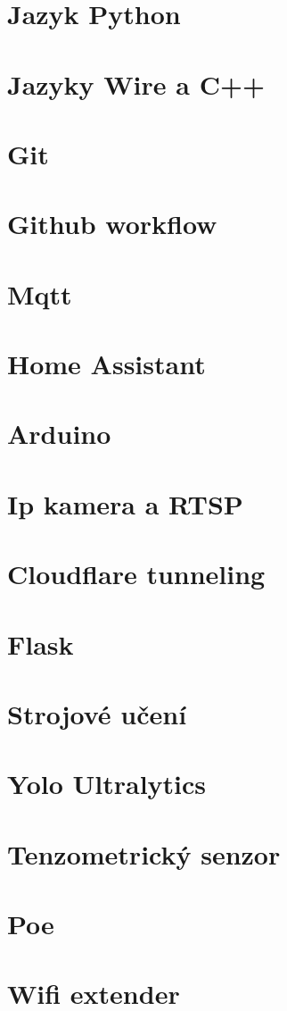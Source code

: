 \section{Jazyk Python}
\section{Jazyky Wire a C++ }
\section{Git}
\section{Github workflow}
\section{Mqtt}
\section{Home Assistant}
\section{Arduino}
\section{Ip kamera a RTSP}
\section{Cloudflare tunneling}
\section{Flask}
\section{Strojové učení}
\section{Yolo Ultralytics}
\section{Tenzometrický senzor}
\section{Poe}
\section{Wifi extender}
